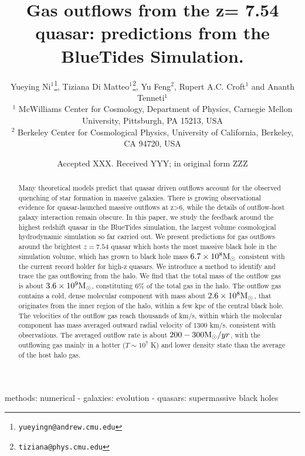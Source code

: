 \documentclass[a4paper,usenatbib]{mnras}
\title[Quasar gas outflows at z=7.54 from BlueTides]{Gas outflows from the z= 7.54 quasar: predictions from the BlueTides Simulation.}
\author[et al.]{Yueying Ni$^{1}$\thanks{\tt yueyingn@andrew.cmu.edu}, Tiziana Di Matteo$^{1}$\thanks{\tt tiziana@phys.cmu.edu}, Yu Feng$^{2}$, Rupert A.C. Croft$^{1}$
and Ananth Tenneti$^{1}$\\
$^{1}$ McWilliams Center for Cosmology, Department of Physics, Carnegie Mellon University, Pittsburgh, PA 15213, USA\\
$^{2}$ Berkeley Center for Cosmological Physics, University of California, Berkeley, CA 94720, USA
}
\date{Accepted XXX. Received YYY; in original form ZZZ}
\begin{document}
\label{firstpage}
\pagerange{\pageref{firstpage}--\pageref{lastpage}}
\maketitle

\begin{abstract}
Many theoretical models predict that quasar driven outflows account  for the observed quenching of star formation in massive galaxies. There is growing observational evidence for quasar-launched massive outflows at z>6, while the details of outflow-host galaxy interaction remain obscure. In this paper, we study the feedback around the highest redshift quasar in the BlueTides simulation, the largest volume cosmological hydrodynamic simulation so far carried out. We present predictions for gas outflows around the
brightest $z = 7.54$ 
quasar  which hosts the most massive black hole in the simulation volume, which has grown to black hole mass $6.7\times 10^{8}{\rm M}_\odot$ consistent with the current record holder for high-z quasars.
We introduce a method to identify and trace the gas outflowing from the halo. We find that the total mass of the outflow gas is about $3.6\times 10^{9}{\rm M}_\odot$, constituting 6\% of the total gas in the halo. 
The outflow gas contains a cold, dense molecular component with mass about $2.6\times 10^{8}{\rm M}_\odot$, that originates from the inner region of the halo, within  a few kpc of the central black hole. The velocities of the outflow gas reach thousands of km/s, within which the molecular component has mass averaged outward radial velocity of $1300$ km/s, consistent with observations. The averaged outflow rate is about $200-300 {\rm M}_\odot/yr$, with the outflowing gas mainly in a hotter ($T \sim 10^7$ K) and lower density state than the average of the host halo gas. 
\end{abstract}

\begin{keywords}
methods: numerical - galaxies: evolution - quasars: supermassive black holes
\end{keywords}


\end{document}
